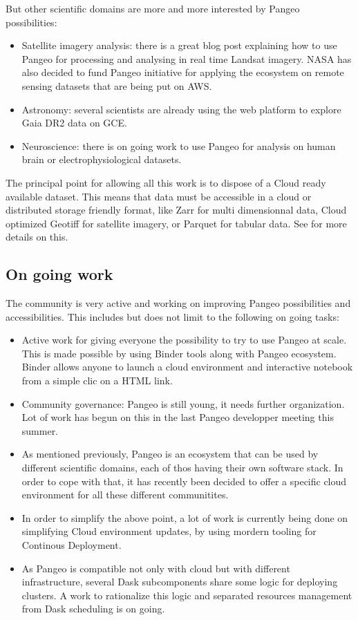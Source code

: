 \documentclass{article}
\begin{document}
But other scientific domains are more and more interested by Pangeo possibilities:
\begin{itemize}
\item Satellite imagery analysis: there is a great blog post\cite{b6} explaining how to use Pangeo for processing and analysing in real time Landsat imagery. NASA has also decided to fund Pangeo initiative for applying the ecosystem on remote sensing datasets that are being put on AWS.
\item Astronomy: several scientists are already using the web platform to explore Gaia DR2 data on GCE.
\item Neuroscience: there is on going work to use Pangeo for analysis on human brain or electrophysiological datasets.
\end{itemize}

The principal point for allowing all this work is to dispose of a Cloud ready available dataset. This means that data must be accessible in a cloud or distributed storage friendly format, like Zarr for multi dimensionnal data, Cloud optimized Geotiff for satellite imagery, or Parquet for tabular data. See \cite{b7} for more details on this.

\subsection{On going work}
\label{ssec:ongowork}

The community is very active and working on improving Pangeo possibilities and accessibilities. This includes but does not limit to the following on going tasks:
\begin{itemize}
\item Active work for giving everyone the possibility to try to use Pangeo at scale. This is made possible by using Binder tools along with Pangeo ecosystem\cite{b8}. Binder allows anyone to launch a cloud environment and interactive notebook from a simple clic on a HTML link.
\item Community governance: Pangeo is still young, it needs further organization. Lot of work has begun on this in the last Pangeo developper meeting this summer.
\item As mentioned previously, Pangeo is an ecosystem that can be used by different scientific domains, each of thos having their own software stack. In order to cope with that, it has recently been decided to offer a specific cloud environment for all these different communitites.
\item In order to simplify the above point, a lot of work is currently being done on simplifying Cloud environment updates, by using mordern tooling for Continous Deployment.
\item As Pangeo is compatible not only with cloud but with different infrastructure, several Dask subcomponents share some logic for deploying clusters. A work to rationalize this logic and separated resources management from Dask scheduling is on going.
\end{itemize}
\end{document}
